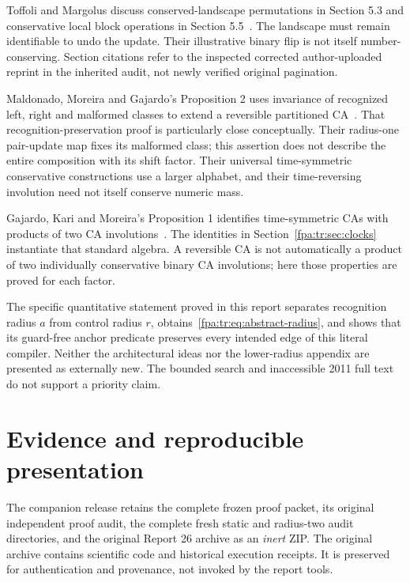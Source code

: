 \documentclass[11pt,a4paper]{article}
\numberwithin{equation}{section}
\begin{document}
Toffoli and Margolus discuss conserved-landscape permutations in Section 5.3 and conservative local block operations in Section 5.5~\cite{fpa:tm}. The landscape must remain identifiable to undo the update. Their illustrative binary flip is not itself number-conserving. Section citations refer to the inspected corrected author-uploaded reprint in the inherited audit, not newly verified original pagination.

Maldonado, Moreira and Gajardo's Proposition 2 uses invariance of recognized left, right and malformed classes to extend a reversible partitioned CA~\cite{fpa:mmg}. That recognition-preservation proof is particularly close conceptually. Their radius-one pair-update map fixes its malformed class; this assertion does not describe the entire composition with its shift factor. Their universal time-symmetric conservative constructions use a larger alphabet, and their time-reversing involution need not itself conserve numeric mass.

Gajardo, Kari and Moreira's Proposition 1 identifies time-symmetric CAs with products of two CA involutions~\cite{fpa:gkm}. The identities in Section~\ref{fpa:tr:sec:clocks} instantiate that standard algebra. A reversible CA is not automatically a product of two individually conservative binary CA involutions; here those properties are proved for each factor.

The specific quantitative statement proved in this report separates recognition radius $a$ from control radius $r$, obtains~\eqref{fpa:tr:eq:abstract-radius}, and shows that its guard-free anchor predicate preserves every intended edge of this literal compiler. Neither the architectural ideas nor the lower-radius appendix are presented as externally new. The bounded search and inaccessible 2011 full text do not support a priority claim.

\section{Evidence and reproducible presentation}\label{fpa:tr:sec:evidence}
The companion release retains the complete frozen proof packet, its original independent proof audit, the complete fresh static and radius-two audit directories, and the original Report 26 archive as an \emph{inert} ZIP. The original archive contains scientific code and historical execution receipts. It is preserved for authentication and provenance, not invoked by the report tools.
\end{document}
